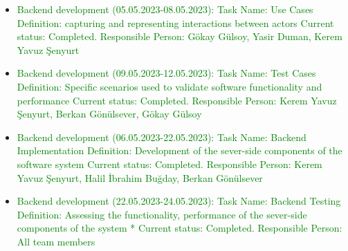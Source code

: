 \documentclass[conference]{IEEEtran}
\begin{document}
\begin{itemize}
  \item \textcolor{green} {Backend development (05.05.2023-08.05.2023):\newline\newline
  Task Name: Use Cases\newline
  Definition:  capturing and representing interactions between actors\newline
  Current status: Completed.\newline 
  Responsible Person: Gökay Gülsoy, Yasir Duman, Kerem Yavuz Şenyurt \newline
}


  \item \textcolor{green} {Backend development (09.05.2023-12.05.2023):\newline\newline
  Task Name: Test Cases\newline
  Definition: Specific scenarios used to validate software functionality and performance  \newline
  Current status: Completed.\newline 
  Responsible Person: Kerem Yavuz Şenyurt, Berkan Gönülsever, Gökay Gülsoy\newline
}



     \item \textcolor{green} {Backend development (06.05.2023-22.05.2023):\newline\newline
  Task Name: Backend Implementation\newline
  Definition:  Development of the sever-side components of the software system\newline
  Current status: Completed.\newline 
  Responsible Person: Kerem Yavuz Şenyurt, Halil İbrahim Buğday, Berkan Gönülsever \newline
}

     \item\textcolor{green} { Backend development (22.05.2023-24.05.2023):\newline\newline
  Task Name: Backend Testing\newline
  Definition:  Assessing the functionality, performance of the sever-side components of the system *\newline
  Current status: Completed.\newline 
  Responsible Person: All team members \newline
}


\end{itemize}
\end{document}
